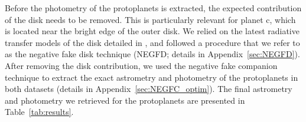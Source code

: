 \documentclass[longauth]{aa}
\begin{document}
    Before the photometry of the protoplanets is extracted, the expected contribution of the disk needs to be removed. This is particularly relevant for planet c, which is located near the bright edge of the outer disk. %
    We relied on the latest radiative transfer models of the disk %
    detailed in \citet{Portilla-Revelo2022, Portilla-Revelo2023}, %
    and followed a procedure that we refer to as the negative fake disk technique (NEGFD; details in Appendix~\ref{sec:NEGFD}).
    After removing the disk contribution, we used the negative fake companion \citep[NEGFC; e.g.,][]{Lagrange2010} technique to extract the exact astrometry and photometry of the protoplanets in both datasets (details in Appendix~\ref{sec:NEGFC_optim}).
    The final astrometry and photometry we retrieved for the protoplanets %
    are presented in Table~\ref{tab:results}. %
\end{document}
